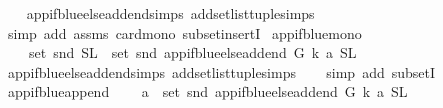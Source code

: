 \begin{isabellebody}
%
\isadelimproof
\ \ %
\endisadelimproof
%
\isatagproof
{}\isamarkupfalse%
\ app{\isacharunderscore}{\kern0pt}if{\isacharunderscore}{\kern0pt}blue{\isacharunderscore}{\kern0pt}else{\isacharunderscore}{\kern0pt}add{\isacharunderscore}{\kern0pt}end{\isachardot}{\kern0pt}simps\ add{\isacharunderscore}{\kern0pt}set{\isacharunderscore}{\kern0pt}list{\isacharunderscore}{\kern0pt}tuple{\isachardot}{\kern0pt}simps\isanewline
\ \ \isamarkupfalse%
\ {\isacharparenleft}{\kern0pt}simp\ add{\isacharcolon}{\kern0pt}\ assms\ card{\isacharunderscore}{\kern0pt}mono\ subset{\isacharunderscore}{\kern0pt}insertI{\isacharparenright}{\kern0pt}%
\endisatagproof
{\isafoldproof}%
%
\isadelimproof
\isanewline
%
\endisadelimproof
\isanewline
{}\isamarkupfalse%
\ app{\isacharunderscore}{\kern0pt}if{\isacharunderscore}{\kern0pt}blue{\isacharunderscore}{\kern0pt}mono{}{\isacharcolon}{\kern0pt}\isanewline
\ \ \ \ {\isachardoublequoteopen}set\ {\isacharparenleft}{\kern0pt}snd\ {\isacharparenleft}{\kern0pt}S{\isacharcomma}{\kern0pt}L{\isacharparenright}{\kern0pt}{\isacharparenright}{\kern0pt}\ {\isasymsubseteq}\ set\ {\isacharparenleft}{\kern0pt}snd\ {\isacharparenleft}{\kern0pt}app{\isacharunderscore}{\kern0pt}if{\isacharunderscore}{\kern0pt}blue{\isacharunderscore}{\kern0pt}else{\isacharunderscore}{\kern0pt}add{\isacharunderscore}{\kern0pt}end\ G\ k\ a\ {\isacharparenleft}{\kern0pt}S{\isacharcomma}{\kern0pt}L{\isacharparenright}{\kern0pt}\ {\isacharparenright}{\kern0pt}{\isacharparenright}{\kern0pt}{\isachardoublequoteclose}\isanewline
%
\isadelimproof
\ \ %
\endisadelimproof
%
\isatagproof
{}\isamarkupfalse%
\ app{\isacharunderscore}{\kern0pt}if{\isacharunderscore}{\kern0pt}blue{\isacharunderscore}{\kern0pt}else{\isacharunderscore}{\kern0pt}add{\isacharunderscore}{\kern0pt}end{\isachardot}{\kern0pt}simps\ add{\isacharunderscore}{\kern0pt}set{\isacharunderscore}{\kern0pt}list{\isacharunderscore}{\kern0pt}tuple{\isachardot}{\kern0pt}simps\isanewline
\ \ \isamarkupfalse%
\ {\isacharparenleft}{\kern0pt}simp\ add{\isacharcolon}{\kern0pt}\ subsetI{\isacharparenright}{\kern0pt}%
\endisatagproof
{\isafoldproof}%
%
\isadelimproof
\isanewline
%
\endisadelimproof
\isanewline
\isanewline
{}\isamarkupfalse%
\ app{\isacharunderscore}{\kern0pt}if{\isacharunderscore}{\kern0pt}blue{\isacharunderscore}{\kern0pt}append{\isacharcolon}{\kern0pt}\isanewline
\ \ \ \ {\isachardoublequoteopen}a\ {\isasymin}\ set\ {\isacharparenleft}{\kern0pt}snd\ {\isacharparenleft}{\kern0pt}app{\isacharunderscore}{\kern0pt}if{\isacharunderscore}{\kern0pt}blue{\isacharunderscore}{\kern0pt}else{\isacharunderscore}{\kern0pt}add{\isacharunderscore}{\kern0pt}end\ G\ k\ a\ {\isacharparenleft}{\kern0pt}S{\isacharcomma}{\kern0pt}L{\isacharparenright}{\kern0pt}\ {\isacharparenright}{\kern0pt}{\isacharparenright}{\kern0pt}{\isachardoublequoteclose}\isanewline

\end{isabellebody}
